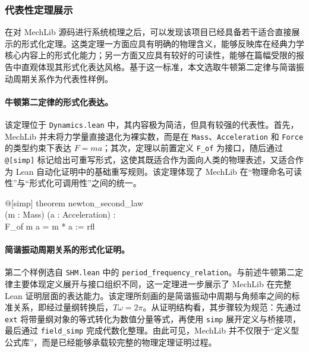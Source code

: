 \documentclass[12pt,a4paper]{ctexart}
\begin{document}
\subsubsection{代表性定理展示}

在对 MechLib 源码进行系统梳理之后，可以发现该项目已经具备若干适合直接展示的形式化定理。这类定理一方面应具有明确的物理含义，能够反映库在经典力学核心内容上的形式化能力；另一方面又应具有较好的可读性，能够在篇幅受限的报告中直观体现其形式化表达风格。基于这一标准，本文选取牛顿第二定律与简谐振动周期关系作为代表性样例。

\paragraph{牛顿第二定律的形式化表达。}
该定理位于 \texttt{Dynamics.lean} 中，其内容极为简洁，但具有较强的代表性。首先，MechLib 并未将力学量直接退化为裸实数，而是在 \texttt{Mass}、\texttt{Acceleration} 和 \texttt{Force} 的类型约束下表达 $F=ma$；其次，定理以前置定义 \texttt{F\_of} 为接口，随后通过 \texttt{@[simp]} 标记给出可重写形式，这使其既适合作为面向人类的物理表述，又适合作为 Lean 自动化证明中的基础重写规则。该定理体现了 MechLib 在“物理命名可读性”与“形式化可调用性”之间的统一。

\begin{codeblock}
\small\ttfamily
@[simp] theorem newton\_second\_law\\
\hspace*{1em}(m : Mass) (a : Acceleration) :\\
\hspace*{1em}F\_of m a = m * a := rfl
\end{codeblock}

\paragraph{简谐振动周期关系的形式化证明。}
第二个样例选自 \texttt{SHM.lean} 中的 \texttt{period\_frequency\_relation}。与前述牛顿第二定律主要体现定义展开与接口组织不同，这一定理进一步展示了 MechLib 在完整 Lean 证明层面的表达能力。该定理所刻画的是简谐振动中周期与角频率之间的标准关系，即经过量纲转换后，$T\omega = 2\pi$。从证明结构看，其步骤较为规范：先通过 \texttt{ext} 将带量纲对象的等式转化为数值分量等式，再使用 \texttt{simp} 展开定义与桥接项，最后通过 \texttt{field\_simp} 完成代数化整理。由此可见，MechLib 并不仅限于“定义型公式库”，而是已经能够承载较完整的物理定理证明过程。
\end{document}
